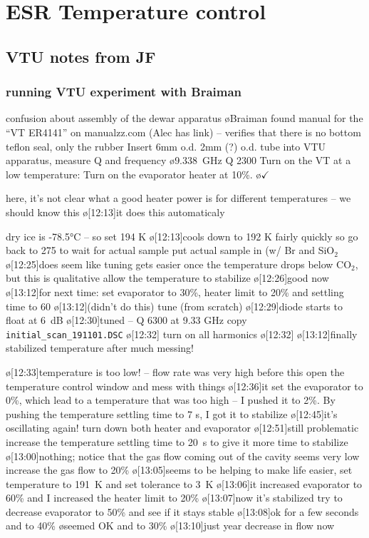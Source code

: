 \section{ESR Temperature control}
\subsection{VTU notes from JF}
\subsubsection{running VTU experiment with Braiman}
confusion about assembly of the dewar apparatus
\o{Braiman found manual for the ``VT ER4141'' on manualzz.com (Alec has link) -- verifies that there is no bottom teflon seal, only the rubber}
Insert 6mm o.d. 2mm (?) o.d. tube into VTU apparatus, measure Q and frequency
\o{9.338~GHz Q 2300}
Turn on the VT at a low temperature:
Turn on the evaporator heater at 10\%.
\o{$\checkmark$}
\begin{err}
    here, it's not clear what a good heater power is for different temperatures -- we should know this
    \o[12:13]{it does this automaticaly}
\end{err}
dry ice is -78.5°C -- so set 194 K
\o[12:13]{cools down to 192 K fairly quickly} so go back to 275 to wait for actual sample
put actual sample in (w/ Br and SiO$_2$
\o[12:25]{does seem like tuning gets easier once the temperature drops below CO$_2$, but this is qualitative}
allow the temperature to stabilize
\o[12:26]{good now}
\o[13:12]{for next time:}
set evaporator to 30\%, heater limit to 20\% and settling time to 60
\o[13:12]{(didn't do this)}
tune (from scratch)
\o[12:29]{diode starts to float at 6~dB}
\o[12:30]{tuned -- Q 6300 at 9.33 GHz}
copy \texttt{initial_scan_191101.DSC}
\o[12:32]{}
turn on all harmonics
\o[12:32]{}
\o[13:12]{finally stabilized temperature after much messing!}
\begin{err}
    \o[12:33]{temperature is too low! -- flow rate was very high before this}
    open the temperature control window and mess with things
    \o[12:36]{it set the evaporator to 0\%, which lead to a temperature that
    was too high -- I pushed it to 2\%. By pushing the temperature settling
    time to 7 s, I got it to stabilize}
    \o[12:45]{it's oscillating again!}
    turn down both heater and evaporator
    \o[12:51]{still problematic}
    increase the temperature settling time to 20~s to give it more time to
    stabilize
    \o[13:00]{nothing; notice that the gas flow coming out of the cavity seems very low}
    increase the gas flow to 20\%
    \o[13:05]{seems to be helping}
    to make life easier, set temperature to 191~K and set tolerance to 3~K
    \o[13:06]{it increased evaporator to 60\% and I increased the heater limit to 20\%}
    \o[13:07]{now it's stabilized}
    try to decrease evaporator to 50\% and see if it stays stable
    \o[13:08]{ok for a few seconds}
    and to 40\%
    \o{seemed OK}
    and to 30\%
    \o[13:10]{just year decrease in flow now}
\end{err}
